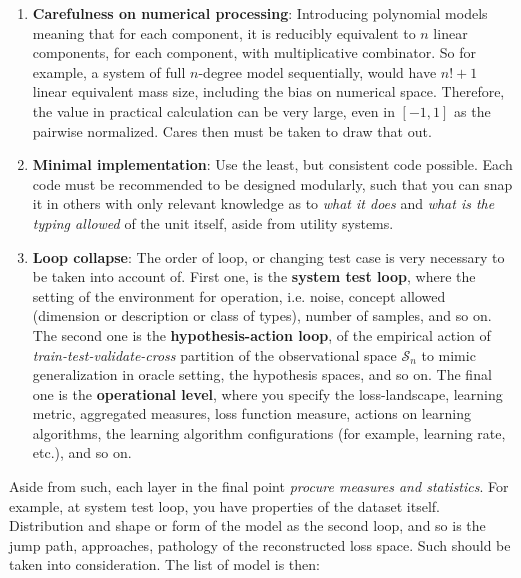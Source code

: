 \begin{enumerate}[topsep=1pt,itemsep=1pt]
    \item \textbf{Carefulness on numerical processing}: Introducing polynomial models meaning that for each component, it is reducibly equivalent to $n$ linear components, for each component, with multiplicative combinator. So for example, a system of full $n$-degree model sequentially, would have $n!+1$ linear equivalent mass size, including the bias on numerical space. Therefore, the value in practical calculation can be very large, even in $[-1,1]$ as the pairwise normalized. Cares then must be taken to draw that out. 
    \item \textbf{Minimal implementation}: Use the least, but consistent code possible. Each code must be recommended to be designed modularly, such that you can snap it in others with only relevant knowledge as to \textit{what it does} and \textit{what is the typing allowed} of the unit itself, aside from utility systems. 
    \item \textbf{Loop collapse}: The order of loop, or changing test case is very necessary to be taken into account of. First one, is the \textbf{system test loop}, where the setting of the environment for operation, i.e. noise, concept allowed (dimension or description or class of types), number of samples, and so on. The second one is the \textbf{hypothesis-action loop}, of the empirical action of \textit{train-test-validate-cross} partition of the observational space $\mathcal{S}_{n}$ to mimic generalization in oracle setting, the hypothesis spaces, and so on. The final one is the \textbf{operational level}, where you specify the loss-landscape, learning metric, aggregated measures, loss function measure, actions on learning algorithms, the learning algorithm configurations (for example, learning rate, etc.), and so on. 
\end{enumerate}
Aside from such, each layer in the final point \textit{procure measures and statistics}. For example, at system test loop, you have properties of the dataset itself. Distribution and shape or form of the model as the second loop, and so is the jump path, approaches, pathology of the reconstructed loss space. Such should be taken into consideration. The list of model is then:

